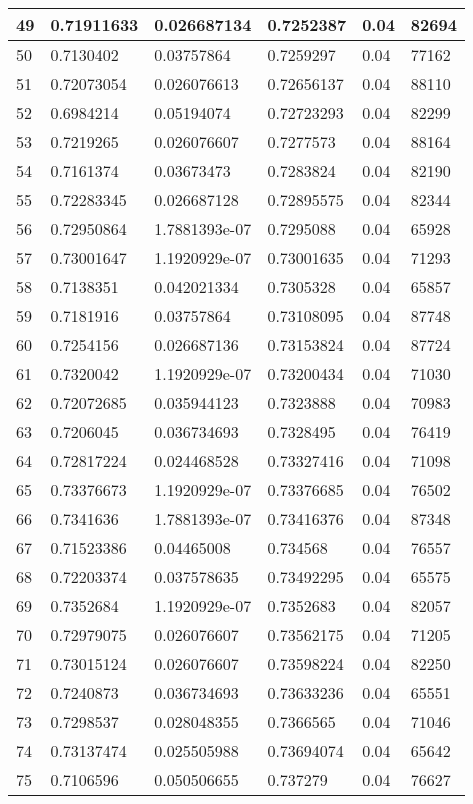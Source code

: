 \begin{longtable}{|l|l|l|l|l|l|}
49 & 0.71911633 & 0.026687134 & 0.7252387 & 0.04 & 82694 \\ \hline 
50 & 0.7130402 & 0.03757864 & 0.7259297 & 0.04 & 77162 \\ \hline 
51 & 0.72073054 & 0.026076613 & 0.72656137 & 0.04 & 88110 \\ \hline 
52 & 0.6984214 & 0.05194074 & 0.72723293 & 0.04 & 82299 \\ \hline 
53 & 0.7219265 & 0.026076607 & 0.7277573 & 0.04 & 88164 \\ \hline 
54 & 0.7161374 & 0.03673473 & 0.7283824 & 0.04 & 82190 \\ \hline 
55 & 0.72283345 & 0.026687128 & 0.72895575 & 0.04 & 82344 \\ \hline 
56 & 0.72950864 & 1.7881393e-07 & 0.7295088 & 0.04 & 65928 \\ \hline 
57 & 0.73001647 & 1.1920929e-07 & 0.73001635 & 0.04 & 71293 \\ \hline 
58 & 0.7138351 & 0.042021334 & 0.7305328 & 0.04 & 65857 \\ \hline 
59 & 0.7181916 & 0.03757864 & 0.73108095 & 0.04 & 87748 \\ \hline 
60 & 0.7254156 & 0.026687136 & 0.73153824 & 0.04 & 87724 \\ \hline 
61 & 0.7320042 & 1.1920929e-07 & 0.73200434 & 0.04 & 71030 \\ \hline 
62 & 0.72072685 & 0.035944123 & 0.7323888 & 0.04 & 70983 \\ \hline 
63 & 0.7206045 & 0.036734693 & 0.7328495 & 0.04 & 76419 \\ \hline 
64 & 0.72817224 & 0.024468528 & 0.73327416 & 0.04 & 71098 \\ \hline 
65 & 0.73376673 & 1.1920929e-07 & 0.73376685 & 0.04 & 76502 \\ \hline 
66 & 0.7341636 & 1.7881393e-07 & 0.73416376 & 0.04 & 87348 \\ \hline 
67 & 0.71523386 & 0.04465008 & 0.734568 & 0.04 & 76557 \\ \hline 
68 & 0.72203374 & 0.037578635 & 0.73492295 & 0.04 & 65575 \\ \hline 
69 & 0.7352684 & 1.1920929e-07 & 0.7352683 & 0.04 & 82057 \\ \hline 
70 & 0.72979075 & 0.026076607 & 0.73562175 & 0.04 & 71205 \\ \hline 
71 & 0.73015124 & 0.026076607 & 0.73598224 & 0.04 & 82250 \\ \hline 
72 & 0.7240873 & 0.036734693 & 0.73633236 & 0.04 & 65551 \\ \hline 
73 & 0.7298537 & 0.028048355 & 0.7366565 & 0.04 & 71046 \\ \hline 
74 & 0.73137474 & 0.025505988 & 0.73694074 & 0.04 & 65642 \\ \hline 
75 & 0.7106596 & 0.050506655 & 0.737279 & 0.04 & 76627 \\ \hline 
\end{longtable}